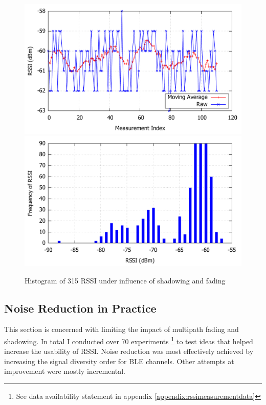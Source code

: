 \documentclass[a4paper, oneside]{ipsreport}
\begin{document}
\begin{figure}[h!]
	\centering
	\includegraphics[width=0.7\linewidth]{./figures/rssifluctuation.pdf}
	\label{fig:rssifluctuation}
	\includegraphics[width=0.7\linewidth]{./figures/rssiDistribution.pdf}
	\caption{Histogram of 315 RSSI under influence of shadowing and fading}
	\label{fig:rssiDistribution}
\end{figure}

\subsection{Noise Reduction in Practice}
\label{subsection:noiseReduction}
This section is concerned with limiting the impact of multipath fading and shadowing. In total I conducted over 70 experiments \footnote{See data availability statement in appendix \ref{appendix:rssimeasurementdata}} to test ideas that helped increase the usability of RSSI. Noise reduction was most effectively achieved by increasing the signal diversity order for BLE channels. Other attempts at improvement were mostly incremental.
\end{document}
